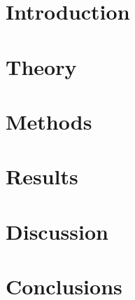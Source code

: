 \documentclass[a4paper, 12pt]{report}
\begin{document}

\chapter{Introduction}



\chapter{Theory}


\chapter{Methods}



\chapter{Results}



\chapter{Discussion}



\chapter{Conclusions}



\printbibliography %


\fancyhf{} %
\renewcommand{\headrulewidth}{0pt} %
\fancyfoot[C]{\thepage} %

%
\end{document}
